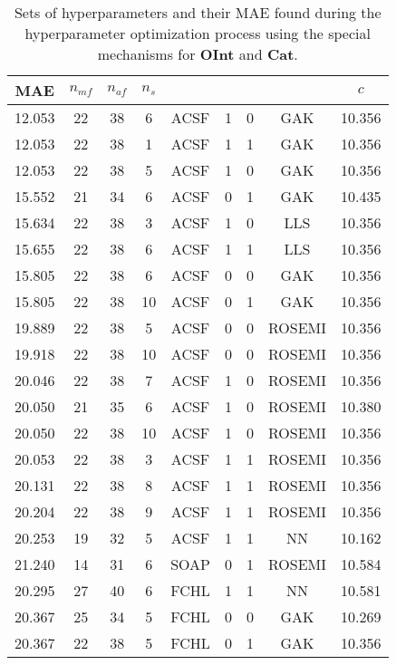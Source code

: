 \documentclass[12pt]{article}
\begin{document}
\begin{table}[H]
	\centering
	\caption{Sets of hyperparameters and their MAE found during the hyperparameter optimization process using the special mechanisms for \textbf{OInt} and \textbf{Cat}.} 
	\begin{tabular}{|c|c|c|c|c|c|c|c|c|}
		\hline
		\textbf{MAE}	& $n_{mf}$ & $n_{af}$ & $n_s$ & \codeword{ftype} & \codeword{norm_af} & \codeword{norm_mf} & \codeword{model} & $c$	\\ \hline
		12.053	& 22	& 38	& 6	& ACSF	& 1	& 0	& GAK	& 10.356	\\ \hline
		12.053	& 22	& 38	& 1	& ACSF	& 1	& 1	& GAK	& 10.356	\\ \hline
		12.053	& 22	& 38	& 5	& ACSF	& 1	& 0	& GAK	& 10.356	\\ \hline
		15.552	& 21	& 34	& 6	& ACSF	& 0	& 1	& GAK	& 10.435	\\ \hline
		15.634	& 22	& 38	& 3	& ACSF	& 1	& 0	& LLS	& 10.356	\\ \hline
		15.655	& 22	& 38	& 6	& ACSF	& 1	& 1	& LLS	& 10.356	\\ \hline
		15.805	& 22	& 38	& 6	& ACSF	& 0	& 0	& GAK	& 10.356	\\ \hline
		15.805	& 22	& 38	& 10	& ACSF	& 0	& 1	& GAK	& 10.356	\\ \hline
		19.889	& 22	& 38	& 5	& ACSF	& 0	& 0	& ROSEMI	& 10.356	\\ \hline
		19.918	& 22	& 38	& 10	& ACSF	& 0	& 0	& ROSEMI	& 10.356	\\ \hline
		20.046	& 22	& 38	& 7	& ACSF	& 1	& 0	& ROSEMI	& 10.356	\\ \hline
		20.050	& 21	& 35	& 6	& ACSF	& 1	& 0	& ROSEMI	& 10.380	\\ \hline
		20.050	& 22	& 38	& 10	& ACSF	& 1	& 0	& ROSEMI	& 10.356	\\ \hline
		20.053	& 22	& 38	& 3	& ACSF	& 1	& 1	& ROSEMI	& 10.356	\\ \hline
		20.131	& 22	& 38	& 8	& ACSF	& 1	& 1	& ROSEMI	& 10.356	\\ \hline
		20.204	& 22	& 38	& 9	& ACSF	& 1	& 1	& ROSEMI	& 10.356	\\ \hline
		20.253	& 19	& 32	& 5	& ACSF	& 1	& 1	& NN	& 10.162	\\ \hline
		21.240	& 14	& 31	& 6	& SOAP	& 0	& 1	& ROSEMI	& 10.584	\\ \hline
		20.295	& 27	& 40	& 6	& FCHL	& 1	& 1	& NN	& 10.581	\\ \hline
		20.367	& 25	& 34	& 5	& FCHL	& 0	& 0	& GAK	& 10.269	\\ \hline
		20.367	& 22	& 38	& 5	& FCHL	& 0	& 1	& GAK	& 10.356	\\ \hline

\end{tabular}
\end{table}
\end{document}
